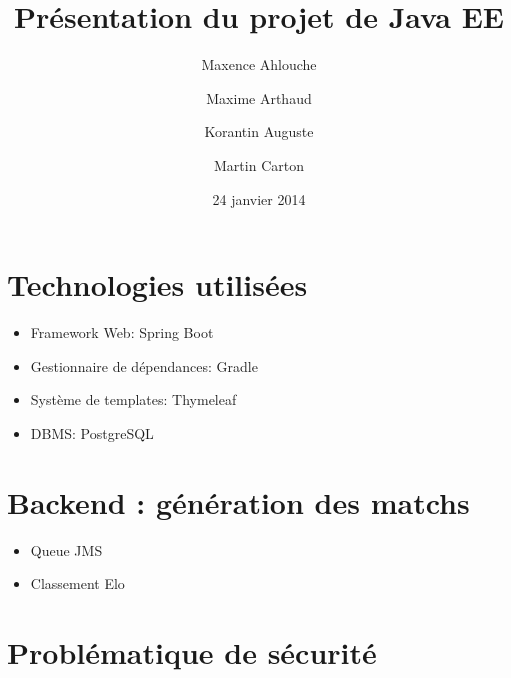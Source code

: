 \documentclass{beamer}
\title{Présentation du projet de Java EE}
\institute{Enseeiht}
\author
  [M.\ Ahlouche \and M.\ Arthaud \and K.\ Auguste \and M.\ Carton]
  {Maxence Ahlouche \and Maxime Arthaud \and Korantin Auguste \and Martin Carton}
\date{24 janvier 2014}
\begin{document}
\begin{frame}
  \titlepage
\end{frame}

\section{Technologies utilisées}
  \begin{frame}
    \begin{itemize}
      \item Framework Web: Spring Boot 
      \item Gestionnaire de dépendances: Gradle 

      \item Système de templates: Thymeleaf 
      \item DBMS: PostgreSQL 

    \end{itemize}
  \end{frame}

\section{Backend : génération des matchs}
\begin{frame}
\begin{itemize}
  \item Queue JMS
  \item Classement Elo
\end{itemize}
\end{frame}

\section{Problématique de sécurité}
\end{document}
